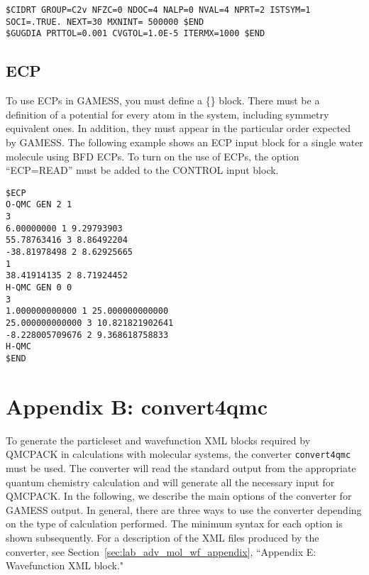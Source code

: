 \begin{lstlisting}[style=GAMESS]
$CIDRT GROUP=C2v NFZC=0 NDOC=4 NALP=0 NVAL=4 NPRT=2 ISTSYM=1 SOCI=.TRUE. NEXT=30 MXNINT= 500000 $END
$GUGDIA PRTTOL=0.001 CVGTOL=1.0E-5 ITERMX=1000 $END
\end{lstlisting}


\subsection{ECP}
To use ECPs in GAMESS, you must define a \{\} 
block. There must be a definition of a potential for every atom in the system, including
symmetry equivalent ones. In addition, they must appear in the particular order expected
by GAMESS. The following example shows an ECP input block for a single water molecule using
BFD ECPs. To turn on the use of ECPs, the option “ECP=READ” must be added to the
CONTROL input block.

\begin{lstlisting}[style=GAMESS]
$ECP
O-QMC GEN 2 1
3
6.00000000 1 9.29793903
55.78763416 3 8.86492204
-38.81978498 2 8.62925665
1
38.41914135 2 8.71924452
H-QMC GEN 0 0
3
1.000000000000 1 25.000000000000
25.000000000000 3 10.821821902641
-8.228005709676 2 9.368618758833
H-QMC
$END
\end{lstlisting}


\newpage
\section{Appendix B: convert4qmc}\label{sec:lab_adv_mol_convert4qmc}
To generate the particleset and wavefunction XML blocks required by QMCPACK in
calculations with molecular systems, the converter \texttt{convert4qmc} must be used. The converter
will read the standard output from the appropriate quantum chemistry calculation and will
generate all the necessary input for QMCPACK. In the following, we describe the main options of the
converter for GAMESS output. In general, there are three ways to use the converter depending
on the type of calculation performed. The minimum syntax for each option is shown subsequently.
For a description of the XML files produced by the converter, see Section~\ref{sec:lab_adv_mol_wf_appendix}, ``Appendix E: Wavefunction XML block."

